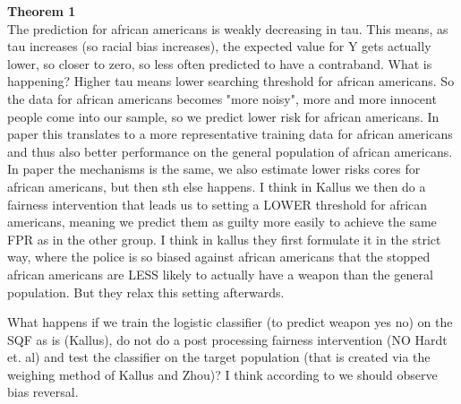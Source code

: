 \textbf{Theorem 1}\\
The prediction for african americans is weakly decreasing in tau. This means, as tau increases (so racial bias increases), the expected value for Y gets actually lower,
so closer to zero, so less often predicted to have a contraband. What is happening? Higher tau means lower searching threshold for african americans.
So the data for african americans becomes "more noisy", more and more innocent people come into our sample, so we predict lower risk for african americans. 
In \cite{RambachanBBOEFW} paper this translates to a more representative training data for african americans and thus also better performance on the general population of african americans.
In \cite{kallus2018} paper the mechanisms is the same, we also estimate lower risks cores for african americans, but then sth else happens.
I think in Kallus we then do a fairness intervention that leads us to setting a LOWER threshold for african americans, meaning we predict them as
guilty more easily to achieve the same FPR as in the other group. I think in kallus they first formulate it in the strict way, where the police is so biased against african americans
that the stopped african americans are LESS likely to actually have a weapon than the general population. But they relax this setting afterwards.


What happens if we train the logistic classifier (to predict weapon yes no) on the SQF as is (Kallus), do not do a post processing fairness intervention (NO Hardt et. al)
and test the classifier on the target population (that is created via the weighing method of Kallus and Zhou)? I think according to \cite{RambachanBBOEFW} we should observe bias reversal.